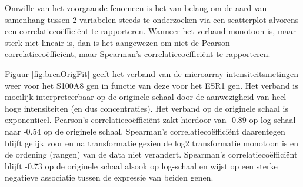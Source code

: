 \documentclass[12pt,dutch,coursenotes]{book}
\theoremstyle{definition}
\theoremstyle{definition}
\theoremstyle{definition}
\theoremstyle{remark}
\begin{document}
Omwille van het voorgaande fenomeen is het van belang om de aard van
samenhang tussen 2 variabelen steeds te onderzoeken via een scatterplot
alvorens een correlatiecoëfficiënt te rapporteren. Wanneer het verband
monotoon is, maar sterk niet-lineair is, dan is het aangewezen om niet
de Pearson correlatiecoëfficiënt, maar Spearman's correlatiecoëfficiënt
te rapporteren.

Figuur \ref{fig:brcaOrigFit} geeft het verband van de microarray
intensiteitsmetingen weer voor het S100A8 gen in functie van deze voor
het ESR1 gen. Het verband is moeilijk interpreteerbaar op de originele
schaal door de aanwezigheid van heel hoge intensiteiten (en dus
concentraties). Het verband op de originele schaal is exponentieel.
Pearson's correlatiecoëfficiënt zakt hierdoor van -0.89 op log-schaal
naar -0.54 op de originele schaal. Spearman's correlatiecoëfficiënt
daarentegen blijft gelijk voor en na transformatie gezien de log2
transformatie monotoon is en de ordening (rangen) van de data niet
verandert. Spearman's correlatiecoëfficiënt blijft -0.73 op de originele
schaal alsook op log-schaal en wijst op een sterke negatieve associatie
tussen de expressie van beiden genen.
\end{document}
